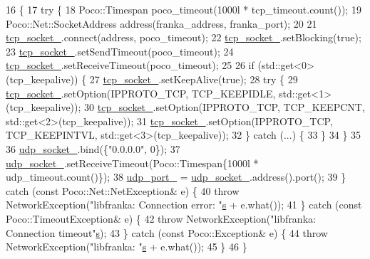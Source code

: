 \begin{DoxyCode}
16                                                               \{
17   \textcolor{keywordflow}{try} \{
18     Poco::Timespan poco\_timeout(1000l * tcp\_timeout.count());
19     Poco::Net::SocketAddress address(franka\_address, franka\_port);
20 
21     \hyperlink{classfranka_1_1Network_a2c26c04f9ccb9792074799b101ee53e9}{tcp\_socket\_}.connect(address, poco\_timeout);
22     \hyperlink{classfranka_1_1Network_a2c26c04f9ccb9792074799b101ee53e9}{tcp\_socket\_}.setBlocking(\textcolor{keyword}{true});
23     \hyperlink{classfranka_1_1Network_a2c26c04f9ccb9792074799b101ee53e9}{tcp\_socket\_}.setSendTimeout(poco\_timeout);
24     \hyperlink{classfranka_1_1Network_a2c26c04f9ccb9792074799b101ee53e9}{tcp\_socket\_}.setReceiveTimeout(poco\_timeout);
25 
26     \textcolor{keywordflow}{if} (std::get<0>(tcp\_keepalive)) \{
27       \hyperlink{classfranka_1_1Network_a2c26c04f9ccb9792074799b101ee53e9}{tcp\_socket\_}.setKeepAlive(\textcolor{keyword}{true});
28       \textcolor{keywordflow}{try} \{
29         \hyperlink{classfranka_1_1Network_a2c26c04f9ccb9792074799b101ee53e9}{tcp\_socket\_}.setOption(IPPROTO\_TCP, TCP\_KEEPIDLE, std::get<1>(tcp\_keepalive));
30         \hyperlink{classfranka_1_1Network_a2c26c04f9ccb9792074799b101ee53e9}{tcp\_socket\_}.setOption(IPPROTO\_TCP, TCP\_KEEPCNT, std::get<2>(tcp\_keepalive));
31         \hyperlink{classfranka_1_1Network_a2c26c04f9ccb9792074799b101ee53e9}{tcp\_socket\_}.setOption(IPPROTO\_TCP, TCP\_KEEPINTVL, std::get<3>(tcp\_keepalive));
32       \} \textcolor{keywordflow}{catch} (...) \{
33       \}
34     \}
35 
36     \hyperlink{classfranka_1_1Network_ac09fea0946977e7c366ad4a3421ef621}{udp\_socket\_}.bind(\{\textcolor{stringliteral}{"0.0.0.0"}, 0\});
37     \hyperlink{classfranka_1_1Network_ac09fea0946977e7c366ad4a3421ef621}{udp\_socket\_}.setReceiveTimeout(Poco::Timespan\{1000l * udp\_timeout.count()\});
38     \hyperlink{classfranka_1_1Network_a8bbe2dd022044033dbb2818db1a0e76b}{udp\_port\_} = \hyperlink{classfranka_1_1Network_ac09fea0946977e7c366ad4a3421ef621}{udp\_socket\_}.address().port();
39   \} \textcolor{keywordflow}{catch} (\textcolor{keyword}{const} Poco::Net::NetException& e) \{
40     \textcolor{keywordflow}{throw} NetworkException(\textcolor{stringliteral}{"libfranka: Connection error: "}\hyperlink{namespaceservice__node__3_aa976421a49e0b54f23833423400849ae}{s} + e.what());
41   \} \textcolor{keywordflow}{catch} (\textcolor{keyword}{const} Poco::TimeoutException& e) \{
42     \textcolor{keywordflow}{throw} NetworkException(\textcolor{stringliteral}{"libfranka: Connection timeout"}\hyperlink{namespaceservice__node__3_aa976421a49e0b54f23833423400849ae}{s});
43   \} \textcolor{keywordflow}{catch} (\textcolor{keyword}{const} Poco::Exception& e) \{
44     \textcolor{keywordflow}{throw} NetworkException(\textcolor{stringliteral}{"libfranka: "}\hyperlink{namespaceservice__node__3_aa976421a49e0b54f23833423400849ae}{s} + e.what());
45   \}
46 \}
\end{DoxyCode}
\mbox{\label{classfranka_1_1Network_a3f3c01dc53b6016a0bb3070ae539667f}} 
